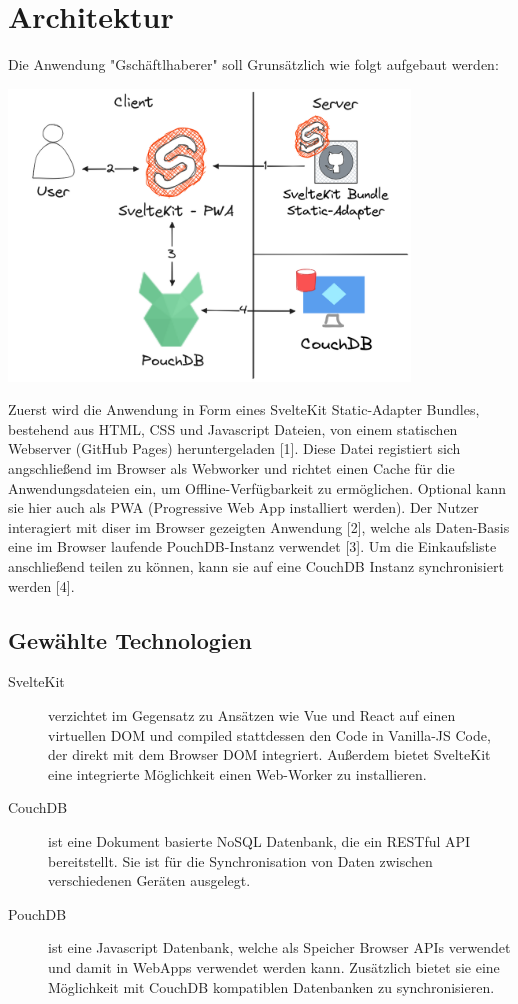 \section{Architektur}

Die Anwendung "Gschäftlhaberer" soll Grunsätzlich wie folgt aufgebaut werden:

\vspace{1em}

\begin{center}
	\includegraphics[width=0.8\textwidth]{images/architecture.png}
\end{center}

Zuerst wird die Anwendung in Form eines SvelteKit Static-Adapter Bundles, bestehend aus HTML, CSS und Javascript Dateien, von einem statischen Webserver (GitHub Pages) heruntergeladen [1]. Diese Datei registiert sich angschließend im Browser als Webworker und richtet einen Cache für die Anwendungsdateien ein, um Offline-Verfügbarkeit zu ermöglichen. Optional kann sie hier auch als PWA (Progressive Web App installiert werden). Der Nutzer interagiert mit diser im Browser gezeigten Anwendung [2], welche als Daten-Basis eine im Browser laufende PouchDB-Instanz verwendet [3]. Um die Einkaufsliste anschließend teilen zu können, kann sie auf eine CouchDB Instanz synchronisiert werden [4].

\subsection{Gewählte Technologien}

\begin{description}
    \item[SvelteKit] verzichtet im Gegensatz zu Ansätzen wie Vue und React auf einen virtuellen DOM und compiled stattdessen den Code in Vanilla-JS Code, der direkt mit dem Browser DOM integriert. Außerdem bietet SvelteKit eine integrierte Möglichkeit einen Web-Worker zu installieren.
    \item[CouchDB] ist eine Dokument basierte NoSQL Datenbank, die ein RESTful API bereitstellt. Sie ist für die Synchronisation von Daten zwischen verschiedenen Geräten ausgelegt.
    \item[PouchDB] ist eine Javascript Datenbank, welche als Speicher Browser APIs verwendet und damit in WebApps verwendet werden kann. Zusätzlich bietet sie eine Möglichkeit mit CouchDB kompatiblen Datenbanken zu synchronisieren.
\end{description}
